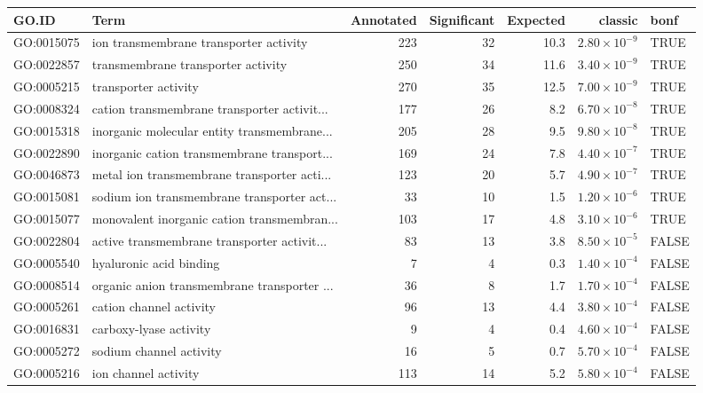 \begin{table}[ht]
\centering
\begin{adjustbox}{max width=\textwidth}
\begin{tabular}{llrrrrl}
  \hline
GO.ID & Term & Annotated & Significant & Expected & classic & bonf \\ 
  \hline
GO:0015075 & ion transmembrane transporter activity & 223 & 32 & 10.3 & $2.80 \times 10^{-9}$ & TRUE \\ 
  GO:0022857 & transmembrane transporter activity & 250 & 34 & 11.6 & $3.40 \times 10^{-9}$ & TRUE \\ 
  GO:0005215 & transporter activity & 270 & 35 & 12.5 & $7.00 \times 10^{-9}$ & TRUE \\ 
  GO:0008324 & cation transmembrane transporter activit... & 177 & 26 & 8.2 & $6.70 \times 10^{-8}$ & TRUE \\ 
  GO:0015318 & inorganic molecular entity transmembrane... & 205 & 28 & 9.5 & $9.80 \times 10^{-8}$ & TRUE \\ 
  GO:0022890 & inorganic cation transmembrane transport... & 169 & 24 & 7.8 & $4.40 \times 10^{-7}$ & TRUE \\ 
  GO:0046873 & metal ion transmembrane transporter acti... & 123 & 20 & 5.7 & $4.90 \times 10^{-7}$ & TRUE \\ 
  GO:0015081 & sodium ion transmembrane transporter act... & 33 & 10 & 1.5 & $1.20 \times 10^{-6}$ & TRUE \\ 
  GO:0015077 & monovalent inorganic cation transmembran... & 103 & 17 & 4.8 & $3.10 \times 10^{-6}$ & TRUE \\ 
  GO:0022804 & active transmembrane transporter activit... & 83 & 13 & 3.8 & $8.50 \times 10^{-5}$ & FALSE \\ 
  GO:0005540 & hyaluronic acid binding & 7 & 4 & 0.3 & $1.40 \times 10^{-4}$ & FALSE \\ 
  GO:0008514 & organic anion transmembrane transporter ... & 36 & 8 & 1.7 & $1.70 \times 10^{-4}$ & FALSE \\ 
  GO:0005261 & cation channel activity & 96 & 13 & 4.4 & $3.80 \times 10^{-4}$ & FALSE \\ 
  GO:0016831 & carboxy-lyase activity & 9 & 4 & 0.4 & $4.60 \times 10^{-4}$ & FALSE \\ 
  GO:0005272 & sodium channel activity & 16 & 5 & 0.7 & $5.70 \times 10^{-4}$ & FALSE \\ 
  GO:0005216 & ion channel activity & 113 & 14 & 5.2 & $5.80 \times 10^{-4}$ & FALSE \\ 

\end{tabular}
\end{adjustbox}
\end{table}
